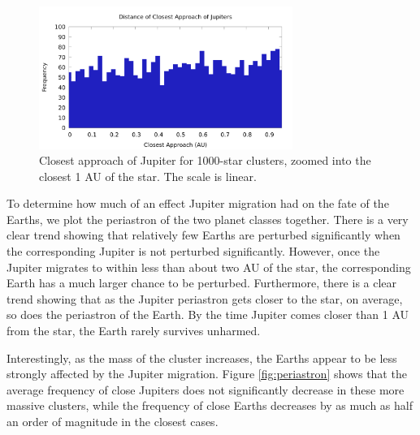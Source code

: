 \documentclass[12pt]{article}
\begin{document}
    \begin{figure}[H]
        \centering
        \caption{Closest approach of Jupiter for 1000-star clusters, zoomed into the 
            closest 1 AU of the star.  The scale is linear.
        }

        \includegraphics[width=3.25in]{periastron_jupiter_1000_close}
    \end{figure}

    To determine how much of an effect Jupiter migration had on the fate of the
    Earths, we plot the periastron of the two planet classes together. There is a
    very clear trend showing that relatively few Earths are perturbed significantly
    when the corresponding Jupiter is not perturbed significantly. However, once the 
    Jupiter migrates to within less than about two AU of the star, the corresponding Earth
    has a much larger chance to be perturbed. Furthermore, there is a clear trend
    showing that as the Jupiter periastron gets closer to the star, on average, so does
    the periastron of the Earth. By the time Jupiter comes closer than 1 AU 
    from the star, the Earth rarely survives unharmed.

    Interestingly, as the mass of the cluster increases, the Earths appear to be
    less strongly affected by the Jupiter migration. Figure \ref{fig:periastron}
    shows that the average frequency of close Jupiters does not significantly decrease
    in these more massive clusters, while the frequency of close Earths decreases
    by as much as half an order of magnitude in the closest cases.
\end{document}
